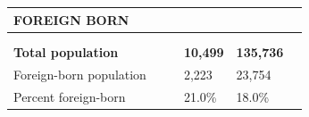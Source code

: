 \documentclass[9pt]{report}
\begin{document}
\newpage
\setlength{\tabcolsep}{.01in} %
\begin{tabular}{p{.10in}p{.10in}p{.10in}p{3.7in}>{\hfill}p{.85in}>{\hfill}p{.85in}>{\hfill}p{.85in}>{\hfill}p{.85in}p{0.1in}}
\multicolumn{9}{l}{\parbox{7.1in}{\raggedright{\large{\strut\textbf{FOREIGN BORN}\strut}}}} \\ 
\hline
\multicolumn{4}{l}{\parbox{3.5in}{\raggedright{\textbf{}}}} & \multicolumn{1}{r}{\parbox{.85in}{\strut\raggedleft{\textbf{}\strut}}} & \multicolumn{1}{r}{\parbox{.85in}{\strut\raggedleft{\textbf{}\strut}}} & \multicolumn{1}{r}{\parbox{.85in}{\strut{}}} & \multicolumn{1}{r}{\parbox{.85in}{\strut{}}} & \\ 
\multicolumn{9}{l}{} \\ 
\multicolumn{4}{l}{\parbox{3.5in}{\strut\raggedright{\textbf{Total population}\strut}}} & \textbf{} & \textbf{} & \textbf{10,499} & \textbf{135,736} & \textbf{} \\ 
\multicolumn{4}{l}{\parbox{3.6in}{\strut\raggedright{{Foreign-born population}}\strut}} &  &  & 2,223 & 23,754 & \multicolumn{1}{l}{}  \\ 
\multicolumn{4}{l}{\parbox{3.6in}{\strut\raggedright{{Percent foreign-born}}\strut}} &  &  & 21.0\% & 18.0\% & \multicolumn{1}{l}{}  \\ 

\end{tabular}
\setlength{\tabcolsep}{6pt} %
\end{document}
